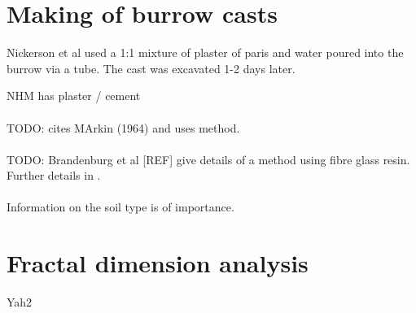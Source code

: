 \documentclass{article}
\begin{document}
   \section{Making of burrow casts}
   Nickerson et al \cite{nickerson1979} used a 1:1 mixture of plaster of paris and water poured into the burrow via a tube. The cast was excavated 1-2 days later.
   
   NHM has plaster / cement
   \paragraph{}
   TODO: \cite{kavanagh1989} cites MArkin (1964) and uses method.
   \paragraph{}
   TODO: Brandenburg et al [REF] give details of a method using fibre glass resin. Further details in \cite{brandenburg2002}.
   \paragraph{}
   Information on the soil type is of importance.
   \section{Fractal dimension analysis}
   Yah2
   \printbibliography{}
\end{document}

